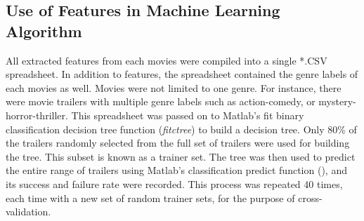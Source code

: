 \documentclass[letterpaper, 10 pt, conference]{ieeeconf}  %
\begin{document}
\subsection{Use of Features in Machine Learning Algorithm}
All extracted features from each movies were compiled into a single *.CSV spreadsheet. In addition to features, the spreadsheet contained the genre labels of each movies as well. Movies were not limited to one genre. For instance, there were movie trailers with multiple genre labels such as action-comedy, or mystery-horror-thriller. This spreadsheet was passed on to Matlab's fit binary classification decision tree function (\textit{fitctree}) to build a decision tree. Only 80\% of the trailers randomly selected from the full set of trailers were used for building the tree. This subset is known as a trainer set. The tree was then used to predict the entire range of trailers using Matlab's classification predict function (), and its success and failure rate were recorded. This process was repeated 40 times, each time with a new set of random trainer sets, for the purpose of cross-validation. 



\end{document}
